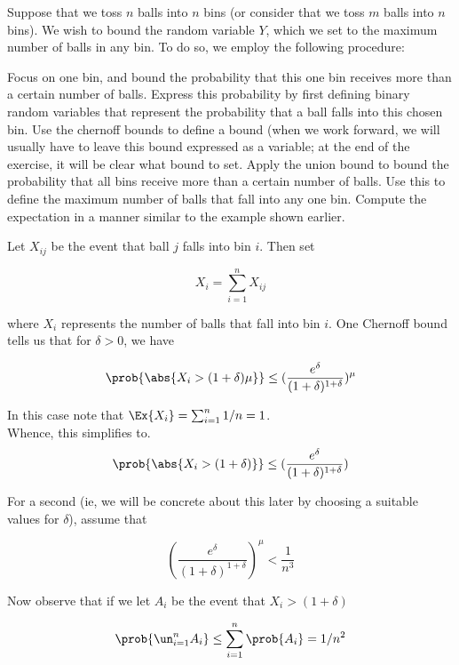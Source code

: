 \documentclass[../main.tex]{subfiles}
\begin{document}
\begin{example}
    Suppose that we toss $n$ balls into $n$ bins (or consider that we toss $m$ balls into $n$ bins). We wish to bound the random variable $Y$, which we set to the maximum number of balls in any bin. To do so, we employ the following procedure:

    \begin{outline}
        \1 Focus on one bin, and bound the probability that this one bin receives more than a certain number of balls.
        \2 Express this probability by first defining binary random variables that represent the probability that a ball falls into this chosen bin.
        \2 Use the chernoff bounds to define a bound (when we work forward, we will usually have to leave this bound expressed as a variable; at the end of the exercise, it will be clear what bound to set.
        \1 Apply the union bound to bound the probability that all bins receive more than a certain number of balls.
        \2 Use this to define the maximum number of balls that fall into any one bin.
        \1 Compute the expectation in a manner similar to the example shown earlier.
    \end{outline}

    Let $X_{ij}$ be the event that ball $j$ falls into bin $i$. Then set 

    \[
        X_{i} = \sum_{i=1}^{n}X_{ij}
    \]

    where $X_{i}$ represents the number of balls that fall into bin $i$. One Chernoff bound tells us that for $\delta > 0$, we have

    \[
        \prob{\abs{X_{i} > (1 + \delta)\mu }} \leq (\frac{e^{\delta}}{(1 + \delta)^{1 + \delta}})^{\mu}
    \]

    In this case note that $\Ex{X_{i}} = \sum_{i=1}^{n}1 /n = 1$. \\

    Whence, this simplifies to.
    \[
        \prob{\abs{X_{i} > (1 + \delta) }} \leq (\frac{e^{\delta}}{(1 + \delta)^{1 + \delta}})
    \]

    For a second (ie, we will be concrete about this later by choosing a suitable values for $\delta$), assume that

    \[
        (\frac{e^{\delta}}{(1 + \delta)^{1 + \delta}})^{\mu} < \frac{1}{n^3}
    \]

    Now observe that if we let $A_{i}$ be the event that $X_{i} > (1 + \delta)$

    \[
        \prob{\un_{i=1}^{n}A_{i}} \leq \sum_{i=1}^{n}\prob{A_{i}} = 1/n^2
    \]


\end{example}
\end{document}
